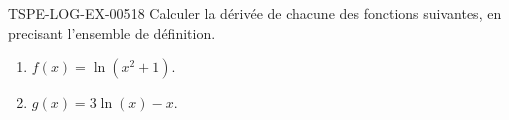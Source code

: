 \begin{exercice}{TSPE-LOG-EX-005}{1}{8}
Calculer la dérivée de chacune des fonctions suivantes, en precisant l'ensemble de définition.
\begin{enumerate}
  \item $f(x) = \ln(x^2+1)$.
  \item $g(x) = 3\ln(x) - x$.
\end{enumerate}
\end{exercice}
